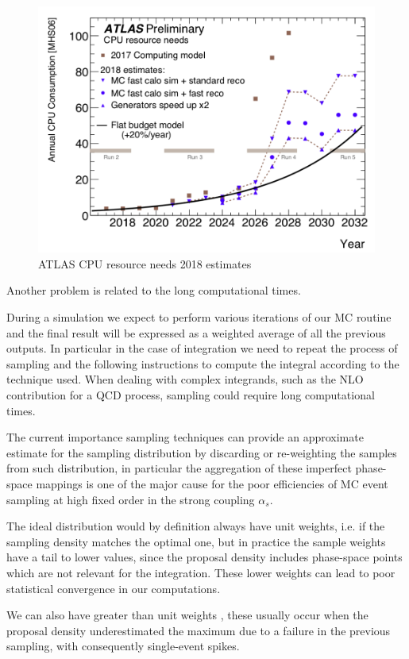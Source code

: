 \documentclass[../main/main.tex]{subfiles}
\begin{document}
\begin{figure}[h]
	\centering
	\includegraphics[width = 12cm]{../images/CPU-cost.png}
	\caption{ATLAS CPU resource needs 2018 estimates}
	\label{CPU cost}
\end{figure}

Another problem is related to the long computational times.

During a simulation we expect to perform various iterations of our MC routine and the final result 
will be expressed as a weighted average of all the previous outputs.
In particular in the case of integration we need to repeat the process of sampling and the following instructions to compute the integral according to the technique used. When dealing with complex integrands, such as the NLO contribution for a QCD process, sampling could require long computational times.

The current importance sampling techniques can provide an approximate estimate for the sampling distribution by discarding or re-weighting
the samples from such distribution, in particular the aggregation of these imperfect phase-space mappings is one of the major cause for
the poor efficiencies of MC event sampling at high fixed order in the strong coupling $\alpha_s$.

The ideal distribution would by definition always have unit weights, i.e. if the sampling density matches the optimal one, but in practice 
the sample weights have a tail to lower values, since the proposal density includes phase-space points which are not relevant for the integration.
These lower weights can lead to poor statistical convergence in our computations.

 We can also have greater than unit weights , these usually occur when the proposal density underestimated the maximum due to a failure in the
previous sampling, with consequently single-event spikes.
\end{document}
